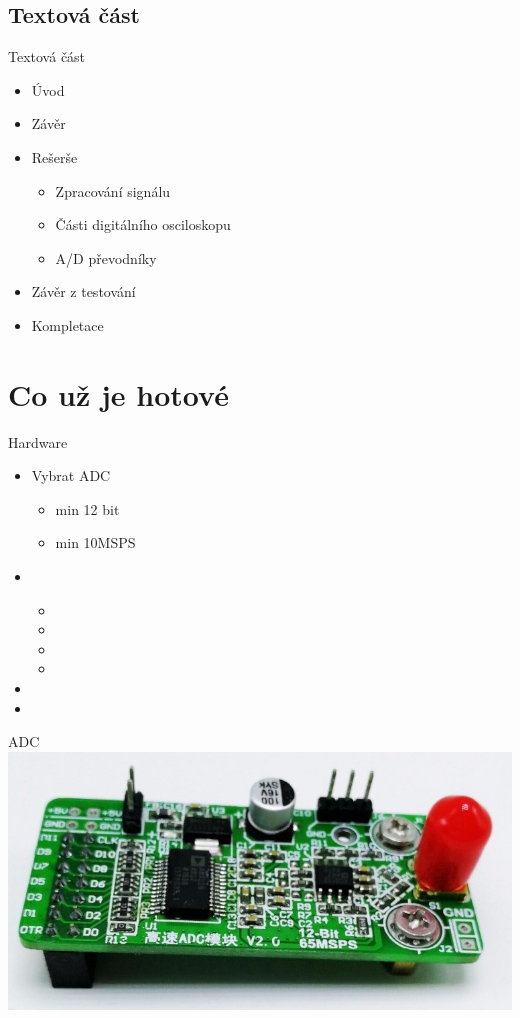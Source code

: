 \documentclass{beamer}
\begin{document}
	\subsection{Textová část}
	\begin{frame}{Textová část}
		\begin{itemize}
			\item Úvod
			\item Závěr
			\item Rešerše
			\begin{itemize}  %
				\item Zpracování signálu
				\item Části digitálního osciloskopu
				\item A/D převodníky
			\end{itemize}
			\item Závěr z testování
			\item Kompletace
		\end{itemize}
	\end{frame}
		
	
\section{Co už je hotové}

		\begin{frame}{Hardware}
		\begin{itemize}
			\item Vybrat ADC
				\begin{itemize}
					\item min 12 bit 
					\item min 10MSPS
				\end{itemize}
			\item[] \ \ \\
				\begin{itemize}
					\item[]
					\item[] 
					\item[]
					\item[]
				\end{itemize}			
			\item[]
			\item[]
		\end{itemize}
	\end{frame}
	
	\begin{frame}{ADC}
		\includegraphics[width=\paperwidth]{adc_board.jpg}
	\end{frame}
\end{document}
